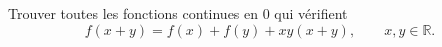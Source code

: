 Trouver toutes les fonctions continues en $0$ qui vérifient
\[ f(x + y) = f(x) + f(y) + xy(x + y),\qquad x, y \in \mathbb{R}. \]
